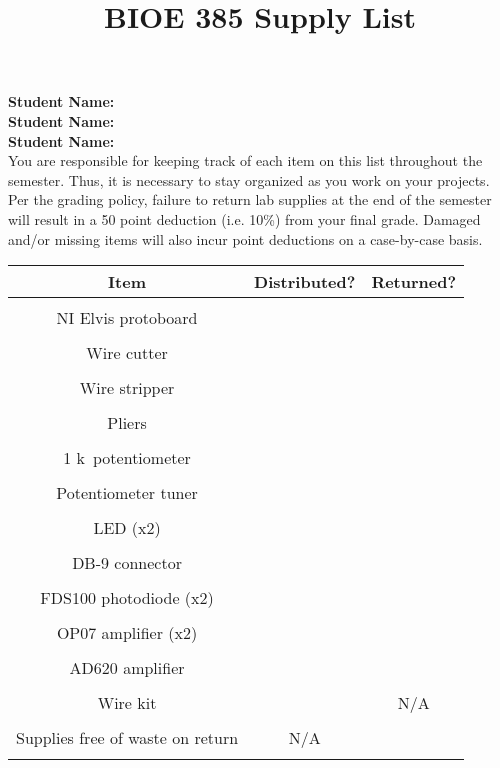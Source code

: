 \documentclass{article}
\title{BIOE 385 Supply List}
\author{ }
\date{}
\begin{document}
\maketitle

\textbf{Student Name:}\\

\textbf{Student Name:}\\

\textbf{Student Name:}\\

You are responsible for keeping track of each item on this list throughout the semester. Thus, it is necessary to stay organized as you work on your projects. Per the grading policy, failure to return lab supplies at the end of the semester will result in a 50 point deduction (i.e. 10\%) from your final grade. Damaged and/or missing items will also incur point deductions on a case-by-case basis.\\

\begin{table}[h!]
	\centering
\begin{tabular}[h!]{ccc}
\toprule
	Item & Distributed? & Returned?\\
	\midrule
	\\
	\hspace{2cm}NI Elvis protoboard\hspace{2cm} & \hspace{4cm} & \hspace{4cm} \\
	\\
	Wire cutter & &\\
	\\
	Wire stripper & &\\
	\\
	Pliers & &\\
	\\
	1 k\textOmega\ potentiometer & &\\
	\\
	Potentiometer tuner & &\\
	\\
	LED (x2) & &\\
	\\
	DB-9 connector & &\\
	\\
	FDS100 photodiode (x2) & &\\
	\\
	OP07 amplifier (x2) & &\\
	\\
	AD620 amplifier & &\\
	\\
	Wire kit & & N/A\\
	\\
	Supplies free of waste on return & N/A &\\
	\\
	\bottomrule
\end{tabular}
\end{table}
\end{document}
